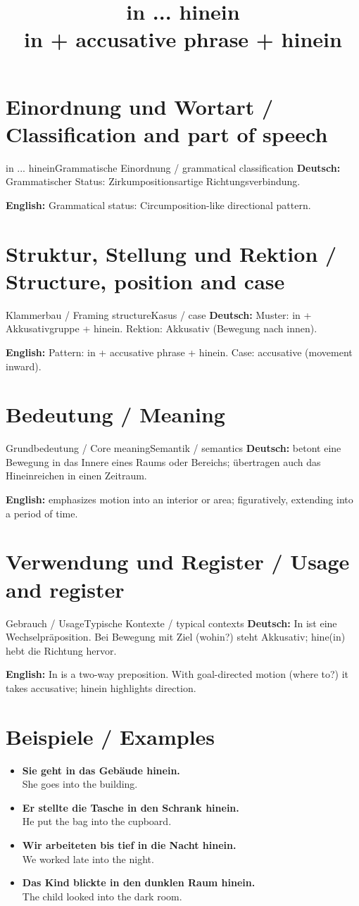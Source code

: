 \documentclass[a4paper,11pt]{article}
\title{in ... hinein\\ \large in + accusative phrase + hinein}
\date{}
\newcommand{\GermanText}[1]{\textbf{Deutsch: }#1\par}
\newcommand{\EnglishText}[1]{{\small\color{SoftGray}\textbf{English: }#1\par}}
\newcommand{\ExampleItem}[2]{\item \textbf{#1}\\{\small\color{SoftGray}#2}}
\begin{document}
\maketitle
\tableofcontents
\newpage
\section{Einordnung und Wortart / Classification and part of speech}
\begin{grammarentry}{in ... hinein}{Grammatische Einordnung / grammatical classification}
\GermanText{Grammatischer Status: Zirkumpositionsartige Richtungsverbindung.}
\EnglishText{Grammatical status: Circumposition-like directional pattern.}
\end{grammarentry}
\section{Struktur, Stellung und Rektion / Structure, position and case}
\begin{grammarentry}{Klammerbau / Framing structure}{Kasus / case}
\GermanText{Muster: in + Akkusativgruppe + hinein. Rektion: Akkusativ (Bewegung nach innen).}
\EnglishText{Pattern: in + accusative phrase + hinein. Case: accusative (movement inward).}
\end{grammarentry}
\section{Bedeutung / Meaning}
\begin{grammarentry}{Grundbedeutung / Core meaning}{Semantik / semantics}
\GermanText{betont eine Bewegung in das Innere eines Raums oder Bereichs; übertragen auch das Hineinreichen in einen Zeitraum.}
\EnglishText{emphasizes motion into an interior or area; figuratively, extending into a period of time.}
\end{grammarentry}
\section{Verwendung und Register / Usage and register}
\begin{grammarentry}{Gebrauch / Usage}{Typische Kontexte / typical contexts}
\GermanText{In ist eine Wechselpräposition. Bei Bewegung mit Ziel (wohin?) steht Akkusativ; hine(in) hebt die Richtung hervor.}
\EnglishText{In is a two-way preposition. With goal-directed motion (where to?) it takes accusative; hinein highlights direction.}
\end{grammarentry}
\section{Beispiele / Examples}
\begin{exbox}
\begin{itemize}
\ExampleItem{Sie geht in das Gebäude hinein.}{She goes into the building.}
\ExampleItem{Er stellte die Tasche in den Schrank hinein.}{He put the bag into the cupboard.}
\ExampleItem{Wir arbeiteten bis tief in die Nacht hinein.}{We worked late into the night.}
\ExampleItem{Das Kind blickte in den dunklen Raum hinein.}{The child looked into the dark room.}
\end{itemize}
\end{exbox}
\end{document}
